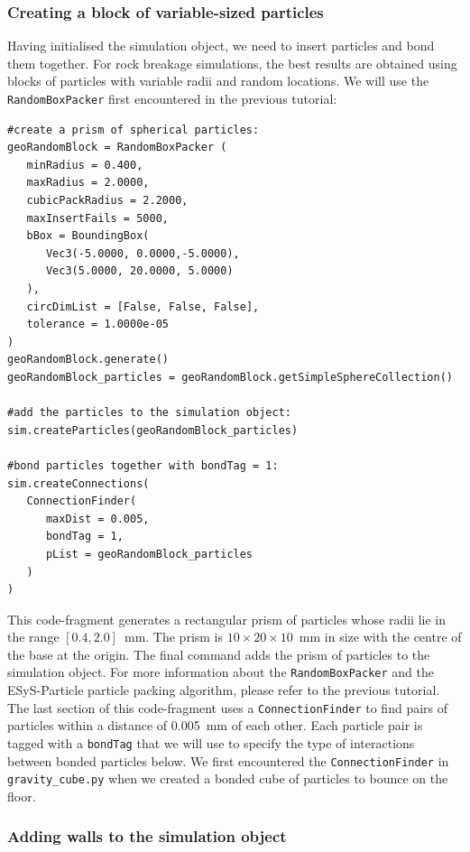 \subsubsection{Creating a block of variable-sized particles}
\label{sec:block_in_sim}

Having initialised the simulation object, we need to insert particles and bond them together. For rock breakage simulations, the best results are obtained using blocks of particles with variable radii and random locations. We will use the \texttt{RandomBoxPacker} first encountered in the previous tutorial:

\begin{verbatim}
#create a prism of spherical particles:
geoRandomBlock = RandomBoxPacker (
   minRadius = 0.400,
   maxRadius = 2.0000,
   cubicPackRadius = 2.2000,
   maxInsertFails = 5000,
   bBox = BoundingBox(
      Vec3(-5.0000, 0.0000,-5.0000),
      Vec3(5.0000, 20.0000, 5.0000)
   ),
   circDimList = [False, False, False],
   tolerance = 1.0000e-05
)
geoRandomBlock.generate()
geoRandomBlock_particles = geoRandomBlock.getSimpleSphereCollection()

#add the particles to the simulation object:
sim.createParticles(geoRandomBlock_particles)

#bond particles together with bondTag = 1:
sim.createConnections(
   ConnectionFinder(
      maxDist = 0.005,
      bondTag = 1,
      pList = geoRandomBlock_particles
   )
)
\end{verbatim}

\noindent
This code-fragment generates a rectangular prism of particles whose radii lie in the range $[0.4, 2.0]$~mm. The prism is $10 \times 20 \times 10$~mm in size with the centre of the base at the origin. The final command adds the prism of particles to the simulation object. For more information about the \texttt{RandomBoxPacker} and the ESyS-Particle particle packing algorithm, please refer to the previous tutorial. The last section of this code-fragment uses a \texttt{ConnectionFinder} to find pairs of particles within a distance of 0.005~mm of each other. Each particle pair is tagged with a \texttt{bondTag} that we will use to specify the type of interactions between bonded particles below. We first encountered the \texttt{ConnectionFinder} in \texttt{gravity\_cube.py} when we created a bonded cube of particles to bounce on the floor.

\subsubsection{Adding walls to the simulation object}

